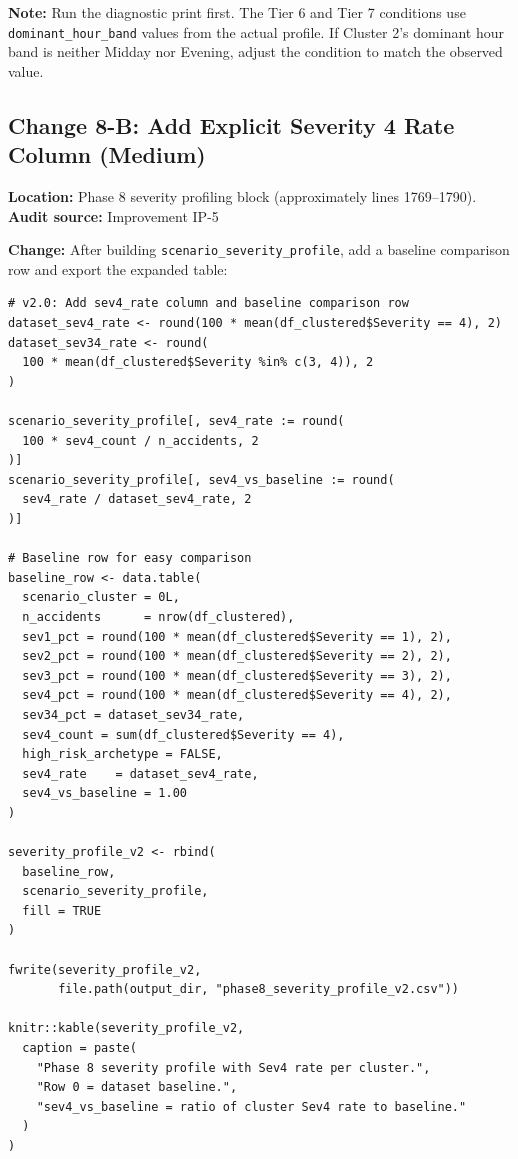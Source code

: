 \documentclass[11pt]{article}
\newcommand{\rcode}[1]{\texttt{#1}}
\begin{document}
\textbf{Note:} Run the diagnostic print first. The Tier 6 and Tier 7
conditions use \rcode{dominant\_hour\_band} values from the actual profile.
If Cluster 2's dominant hour band is neither Midday nor Evening, adjust
the condition to match the observed value.

\subsection{Change 8-B: Add Explicit Severity 4 Rate Column (Medium)}

\textbf{Location:} Phase 8 severity profiling block (approximately
lines 1769--1790).\\
\textbf{Audit source:} Improvement IP-5

\textbf{Change:} After building \rcode{scenario\_severity\_profile},
add a baseline comparison row and export the expanded table:

\begin{lstlisting}
# v2.0: Add sev4_rate column and baseline comparison row
dataset_sev4_rate <- round(100 * mean(df_clustered$Severity == 4), 2)
dataset_sev34_rate <- round(
  100 * mean(df_clustered$Severity %in% c(3, 4)), 2
)

scenario_severity_profile[, sev4_rate := round(
  100 * sev4_count / n_accidents, 2
)]
scenario_severity_profile[, sev4_vs_baseline := round(
  sev4_rate / dataset_sev4_rate, 2
)]

# Baseline row for easy comparison
baseline_row <- data.table(
  scenario_cluster = 0L,
  n_accidents      = nrow(df_clustered),
  sev1_pct = round(100 * mean(df_clustered$Severity == 1), 2),
  sev2_pct = round(100 * mean(df_clustered$Severity == 2), 2),
  sev3_pct = round(100 * mean(df_clustered$Severity == 3), 2),
  sev4_pct = round(100 * mean(df_clustered$Severity == 4), 2),
  sev34_pct = dataset_sev34_rate,
  sev4_count = sum(df_clustered$Severity == 4),
  high_risk_archetype = FALSE,
  sev4_rate    = dataset_sev4_rate,
  sev4_vs_baseline = 1.00
)

severity_profile_v2 <- rbind(
  baseline_row,
  scenario_severity_profile,
  fill = TRUE
)

fwrite(severity_profile_v2,
       file.path(output_dir, "phase8_severity_profile_v2.csv"))

knitr::kable(severity_profile_v2,
  caption = paste(
    "Phase 8 severity profile with Sev4 rate per cluster.",
    "Row 0 = dataset baseline.",
    "sev4_vs_baseline = ratio of cluster Sev4 rate to baseline."
  )
)
\end{lstlisting}
\end{document}
